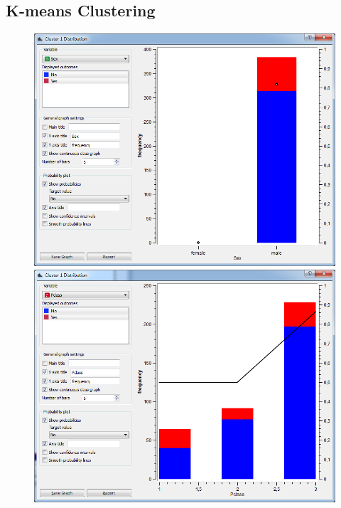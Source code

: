 \documentclass[a4paper,11pt]{article}
\begin{document}
\subsection{K-means Clustering}
\begin{figure}[h]
	\centering
	\begin{flushleft}
		\includegraphics[scale=0.30]{ClusterDistribution/Cluster1/Sex}
		\includegraphics[scale=0.30]{ClusterDistribution/Cluster1/PClass}\\

\end{flushleft}
\end{figure}
\end{document}
